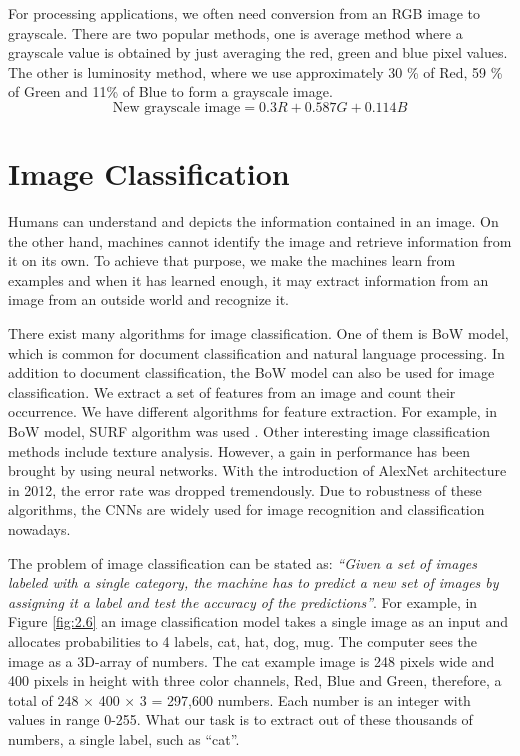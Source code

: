 For processing applications, we often need conversion from an RGB image to grayscale. There are two popular methods, one is average method where a grayscale value is obtained by just averaging the red, green and blue pixel values. The other is luminosity method, where we use approximately 30 \% of Red, 59 \% of Green and
11\% of Blue to form a grayscale image.
\begin{equation}
	\mbox{New grayscale image} = 0.3R + 0.587G + 0.114B
\end{equation}
\section{Image Classification}
Humans can understand and depicts the information contained in an image. On the other 
hand, machines cannot identify the image and retrieve information from it on its own. To 
achieve that purpose, we make the machines learn from examples and when it has learned 
enough, it may extract information from an image from an outside world and recognize it.

There exist many algorithms for image classification. One of them is BoW 
model, which is common for document classification and natural language 
processing. In addition to document classification, the BoW model can also be used for 
image classification. We extract a set of features from an image and count 
their occurrence. We have different algorithms for feature extraction. For example, in 
BoW model, SURF algorithm was used \cite{chap_2_article:8}. Other interesting image 
classification methods include texture analysis. However, a gain in performance has been 
brought by using neural networks. With the introduction of AlexNet architecture in 
2012, the error rate was dropped tremendously. Due to robustness of these 
algorithms, the CNNs are widely used for 
image recognition and classification nowadays. 

The problem of image classification can be stated as: \textit{“Given a set of 
images labeled with a single category, the machine has to predict a new set 
of images by assigning it a label and test the accuracy of the predictions”}. For 
example, in Figure \ref{fig:2.6} an image classification model takes a single image
as an input and allocates probabilities to 4 labels, {cat, hat, dog, mug}.
The computer sees the image as a 
3D-array of numbers. The cat example image is 248 pixels wide and 400 pixels in height 
with three color channels, Red, Blue and Green, therefore, a total 
of 248 $\times$ 400 $\times$ 3  = 297,600 numbers. Each number is an integer with values 
in range 0-255. What our task is to extract out of these 
thousands of numbers, a single label, such as “cat”. 

